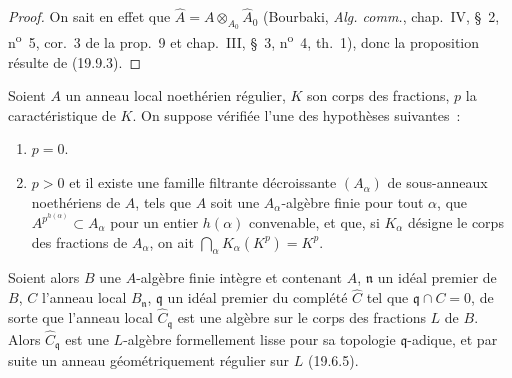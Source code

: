 \begin{proof}
On sait en effet que
$\widehat A=A\otimes_{A_0}\widehat A_0$ (Bourbaki,
\emph{Alg. comm.}, chap.~IV, §~2, n\textsuperscript{o}~5, cor.~3 de la
prop.~9 et chap.~III, §~3, n\textsuperscript{o}~4, th.~1), donc la proposition
résulte de (19.9.3).
\end{proof}

\begin{proposition}[22.3.2]
\label{0.22.3.2-fr}
Soient $A$ un anneau local noethérien régulier, $K$ son corps des fractions,
$p$ la caractéristique de $K$. On suppose vérifiée l'une des hypothèses
suivantes~:
\begin{enumerate}
  \item[\textup{(i)}] $p=0$.
  \item[\textup{(ii)}] $p>0$ et il existe une famille filtrante décroissante
  $(A_\alpha)$ de sous-anneaux noethériens de $A$, tels que $A$ soit une
  $A_\alpha$-algèbre finie pour tout $\alpha$, que
  $A^{p^{h(\alpha)}}\subset A_\alpha$ pour un entier $h(\alpha)$ convenable,
  et que, si $K_\alpha$ désigne le corps des fractions de $A_\alpha$, on ait
  $\bigcap_\alpha K_\alpha(K^p)=K^p$.
\end{enumerate}

Soient alors $B$ une $A$-algèbre finie intègre et contenant $A$,
$\mathfrak n$ un idéal premier de $B$, $C$ l'anneau local $B_\mathfrak n$,
$\mathfrak q$ un idéal premier du complété $\widehat C$ tel que
$\mathfrak q\cap C=0$, de sorte que l'anneau local
$\widehat C_\mathfrak q$ est une algèbre sur le corps des fractions $L$ de
$B$. Alors $\widehat C_\mathfrak q$ est une $L$-algèbre formellement lisse
pour sa topologie $\mathfrak q$-adique, et par suite un anneau
géométriquement régulier sur $L$ \textup{(19.6.5)}.
\end{proposition}

